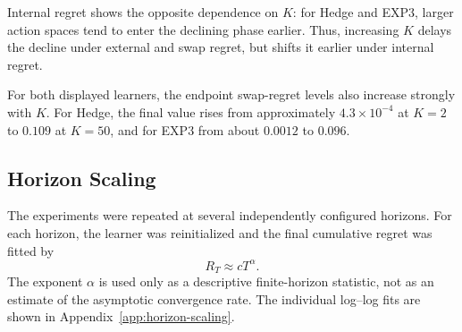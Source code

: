 Internal regret shows the opposite dependence on \(K\): for Hedge and EXP3,
larger action spaces tend to enter the declining phase earlier. Thus,
increasing \(K\) delays the decline under external and swap regret, but shifts
it earlier under internal regret.

For both displayed learners, the endpoint swap-regret levels also increase
strongly with \(K\). For Hedge, the final value rises from approximately
\(4.3\times10^{-4}\) at \(K=2\) to \(0.109\) at \(K=50\), and for EXP3
from about \(0.0012\) to \(0.096\).


\subsection{Horizon Scaling}
\label{sec:horizon-scaling-results}

The experiments were repeated at several independently configured horizons.
For each horizon, the learner was reinitialized and the final cumulative
regret was fitted by
\[
    R_T \approx cT^\alpha .
\]
The exponent \(\alpha\) is used only as a descriptive finite-horizon statistic,
not as an estimate of the asymptotic convergence rate. The individual
log--log fits are shown in Appendix~\ref{app:horizon-scaling}.

